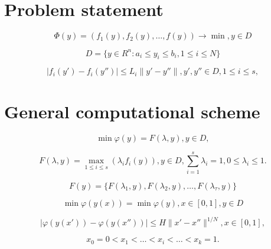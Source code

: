 \documentclass[runningheads]{llncs}
\begin{document}
\section{Problem statement}
\label{sec:2}

\begin{equation}
\label{eq:01}
  \Phi(y) = (f_1 (y),f_2 (y), \dots, f(y)) \to \min, y \in D
\end{equation}

\begin{equation}
\label{eq:02}
    D=\{y \in R^n : a_i \leq y_i \leq b_i, 1 \leq i \leq N\}
\end{equation}


\begin{equation}
\label{eq:03}
|f_i (y') - f_i (y'')| \leq L_i \|y' - y''\| ,y',y'' \in D, 1 \leq i \leq s,
\end{equation}

\section{General computational scheme}
\label{sec:3}

\begin{equation}
\label{eq:04}
\min \varphi(y) = F( \lambda, y ), y \in D,
\end{equation}


\begin{equation}
\label{eq:05}
F(\lambda, y) = \max_{1 \leq i \leq s} {(\lambda_i f_i (y))}, y \in D, \sum_{i=1}^s {\lambda_i} = 1, 0 \leq \lambda_i \leq 1.
\end{equation}


\begin{equation}
\label{eq:06}
F(y) = \{ F(\lambda_1,y),F(\lambda_2,y), \dots ,F(\lambda_\tau,y)\}
\end{equation}


\begin{equation}
\label{eq:07}
\min{\varphi(y(x))} = \min {\varphi(y)}, x \in [0,1], y \in D
\end{equation}


\begin{equation}
\label{eq:08}
|\varphi(y(x')) - \varphi(y(x''))| \leq H \|x' - x''\|^{1/N} , x \in [0,1],
\end{equation}


\begin{equation}
    \label{eq:09}
    x_0 = 0 < x_1 < \dots < x_i < \dots < x_{k} = 1.
\end{equation}
\end{document}
